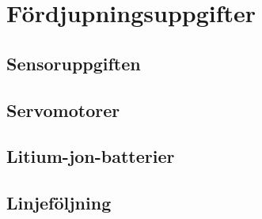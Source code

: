 

\section{Fördjupningsuppgifter}

\subsection{Sensoruppgiften}

\subsection{Servomotorer}

\subsection{Litium-jon-batterier}

\subsection{Linjeföljning}
